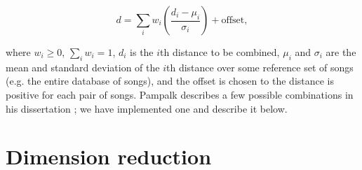 \documentclass[12pt]{article}
\begin{document}
\[ d = \sum_{i} w_i \left(\dfrac{d_i - \mu_i}{\sigma_i}\right) + \text{offset}, \]

\noindent where $w_i\ge 0$, $\sum_i w_i=1$, $d_i$ is the $i$th distance to be combined, $\mu_i$ and $\sigma_i$ are the mean and standard deviation of the $i$th distance over some reference set of songs (e.g. the entire database of songs), and the offset is chosen to the distance is positive for each pair of songs.  Pampalk describes a few possible combinations in his dissertation \cite{pampalk:dissertation}; we have implemented one and describe it below.\\


\section{Dimension reduction}
%
\end{document}
